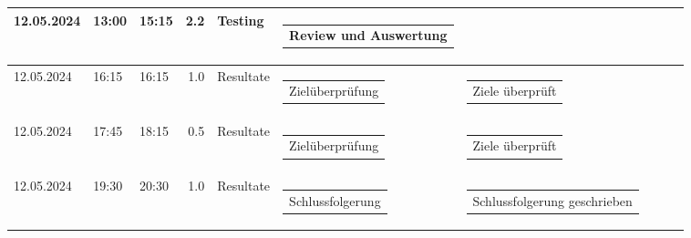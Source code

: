 {\begin{longtable}[H]{lllrllllll}
12.05.2024 & 13:00 & 15:15 & 2.2 & Testing & \begin{tabular}[c]{@{}l@{}}Review und Auswertung\end{tabular} & \begin{tabular}[c]{@{}l@{}}\end{tabular} & \begin{tabular}[c]{@{}l@{}}\end{tabular} & \begin{tabular}[c]{@{}l@{}}\end{tabular} & \begin{tabular}[c]{@{}l@{}}\end{tabular} \\ \midrule
12.05.2024 & 16:15 & 16:15 & 1.0 & Resultate & \begin{tabular}[c]{@{}l@{}}Zielüberprüfung\end{tabular} & \begin{tabular}[c]{@{}l@{}}Ziele überprüft\end{tabular} & \begin{tabular}[c]{@{}l@{}}\end{tabular} & \begin{tabular}[c]{@{}l@{}}\end{tabular} & \begin{tabular}[c]{@{}l@{}}\end{tabular} \\ \midrule
12.05.2024 & 17:45 & 18:15 & 0.5 & Resultate & \begin{tabular}[c]{@{}l@{}}Zielüberprüfung\end{tabular} & \begin{tabular}[c]{@{}l@{}}Ziele überprüft\end{tabular} & \begin{tabular}[c]{@{}l@{}}\end{tabular} & \begin{tabular}[c]{@{}l@{}}\end{tabular} & \begin{tabular}[c]{@{}l@{}}\end{tabular} \\ \midrule
12.05.2024 & 19:30 & 20:30 & 1.0 & Resultate & \begin{tabular}[c]{@{}l@{}}Schlussfolgerung\end{tabular} & \begin{tabular}[c]{@{}l@{}}Schlussfolgerung geschrieben\end{tabular} & \begin{tabular}[c]{@{}l@{}}\end{tabular} & \begin{tabular}[c]{@{}l@{}}\end{tabular} & \begin{tabular}[c]{@{}l@{}}\end{tabular} \\ \midrule

\end{longtable}}
